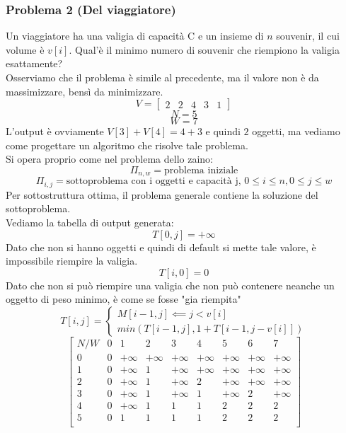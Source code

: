 \documentclass[a4paper,12pt]{article}
\begin{document}
\subsubsection{Problema 2 (Del viaggiatore)}
Un viaggiatore ha una valigia di capacità C e un insieme di $n$ souvenir, il cui volume è $v[i]$. Qual'è il minimo numero di souvenir che riempiono la valigia esattamente?\\
Osserviamo che il problema è simile al precedente, ma il valore non è da massimizzare, bensì da minimizzare.
\[
V = \begin{bmatrix}
    2 & 2 & 4 & 3 & 1
\end{bmatrix}
\]
\[
N = 5
\]
\[
W = 7
\]
L'output è ovviamente $V[3] + V[4] = 4 + 3$ e quindi $2$ oggetti, ma vediamo come progettare un algoritmo che risolve tale problema.\\
Si opera proprio come nel problema dello zaino:
\[
\Pi_{n,w} = \text{problema iniziale}
\]
\[
\Pi_{i,j} = \text{sottoproblema con i oggetti e capacità j, }0 \leq i \leq n, 0 \leq j \leq w
\]
Per sottostruttura ottima, il problema generale contiene la soluzione del sottoproblema.\\
Vediamo la tabella di output generata:
\[
T[0,j] = +\infty
\]
Dato che non si hanno oggetti e quindi di default si mette tale valore, è impossibile riempire la valigia.
\[
T[i,0] = 0
\]
Dato che non si può riempire una valigia che non può contenere neanche un oggetto di peso minimo, è come se fosse "gia riempita"
\[
T[i,j] = \begin{cases}
    M[i-1,j] \impliedby j < v[i]\\
    min(T[i-1,j],1 + T[i-1,j-v[i]])
\end{cases}
\]
\[
\begin{bmatrix}
    N / W & 0 & 1 & 2 & 3 & 4 & 5 & 6 & 7\\
    0 & 0 & +\infty & +\infty & +\infty & +\infty & +\infty & +\infty & +\infty\\
    1 & 0 & +\infty & 1 & +\infty & +\infty & +\infty & +\infty & +\infty\\ 
    2 & 0 & +\infty & 1 & +\infty & 2 & +\infty & +\infty & +\infty\\  
    3 & 0 & +\infty & 1 & +\infty & 1 & +\infty & 2 & +\infty\\ 
    4 & 0 & +\infty & 1 & 1 & 1 & 2 & 2 & 2\\
    5 & 0 & 1 & 1 & 1 & 1 & 2 & 2 & 2\\
\end{bmatrix}
\]
\end{document}

